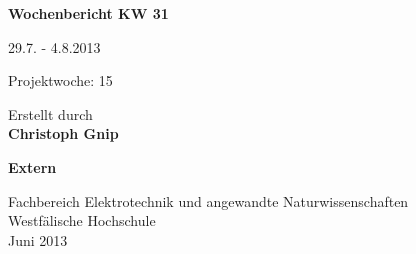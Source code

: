
\begin{center}
{\Huge \textbf{Wochenbericht KW 31}\par}
\vspace{1cm}
{\Huge 29.7. - 4.8.2013\par}
\vspace{1cm}
{\Huge Projektwoche: 15\par}

\vspace{2cm}

\large{Erstellt durch}\\
\Large{\textbf{Christoph Gnip}}

\vspace{4cm}

\Large{\textbf{Extern}}

\vfill

{\normalsize Fachbereich Elektrotechnik und angewandte Naturwissenschaften\\
Westfälische Hochschule\\[2ex]Juni 2013}

\end{center}
\newpage